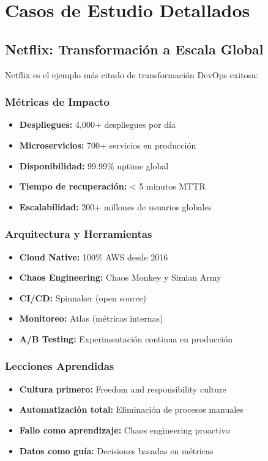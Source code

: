 \documentclass[12pt,a4paper]{article}
\begin{document}
\section{Casos de Estudio Detallados}

\subsection{Netflix: Transformación a Escala Global}
Netflix es el ejemplo más citado de transformación DevOps exitosa:

\subsubsection{Métricas de Impacto}
\begin{itemize}
    \item \textbf{Despliegues:} 4,000+ despliegues por día
    \item \textbf{Microservicios:} 700+ servicios en producción
    \item \textbf{Disponibilidad:} 99.99\% uptime global
    \item \textbf{Tiempo de recuperación:} < 5 minutos MTTR
    \item \textbf{Escalabilidad:} 200+ millones de usuarios globales
\end{itemize}

\subsubsection{Arquitectura y Herramientas}
\begin{itemize}
    \item \textbf{Cloud Native:} 100\% AWS desde 2016
    \item \textbf{Chaos Engineering:} Chaos Monkey y Simian Army
    \item \textbf{CI/CD:} Spinnaker (open source)
    \item \textbf{Monitoreo:} Atlas (métricas internas)
    \item \textbf{A/B Testing:} Experimentación continua en producción
\end{itemize}

\subsubsection{Lecciones Aprendidas}
\begin{itemize}
    \item \textbf{Cultura primero:} Freedom and responsibility culture
    \item \textbf{Automatización total:} Eliminación de procesos manuales
    \item \textbf{Fallo como aprendizaje:} Chaos engineering proactivo
    \item \textbf{Datos como guía:} Decisiones basadas en métricas
\end{itemize}
\end{document}
